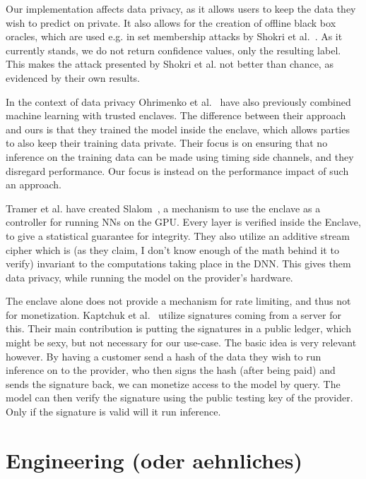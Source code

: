\documentclass[11pt]{article}
\begin{document}
Our implementation affects data privacy, as it allows users to keep the data they wish to predict on private.
It also allows for the creation of offline black box oracles, which are used e.g. in set membership attacks by Shokri et al.~\cite{shokri_membership_2017}.
As it currently stands, we do not return confidence values, only the resulting label.
This makes the attack presented by Shokri et al. not better than chance, as evidenced by their own results.

In the context of data privacy Ohrimenko et al.~\cite{ohrimenko_oblivious_2016} have also previously combined machine learning with trusted enclaves.
The difference between their approach and ours is that they trained the model inside the enclave, which allows parties to also keep their training data private.
Their focus is on ensuring that no inference on the training data can be made using timing side channels, and they disregard performance.
Our focus is instead on the performance impact of such an approach.

Tramer et al. have created Slalom~\cite{tramer_slalom_2019}, a mechanism to use the enclave as a controller for running NNs on the GPU.
Every layer is verified inside the Enclave, to give a statistical guarantee for integrity.
They also utilize an additive stream cipher which is (as they claim, I don't know enough of the math behind it to verify) invariant to the computations taking place in the DNN.
This gives them data privacy, while running the model on the provider's hardware.

The enclave alone does not provide a mechanism for rate limiting, and thus not for monetization.
Kaptchuk et al.~\cite{kaptchuk_giving_nodate} utilize signatures coming from a server for this.
Their main contribution is putting the signatures in a public ledger, which might be sexy, but not necessary for our use-case.
The basic idea is very relevant however.
By having a customer send a hash of the data they wish to run inference on to the provider, who then signs the hash (after being paid) and sends the signature back, we can monetize access to the model by query.
The model can then verify the signature using the public testing key of the provider.
Only if the signature is valid will it run inference.

\section{Engineering (oder aehnliches)}
\label{sec:engineering}
\end{document}
